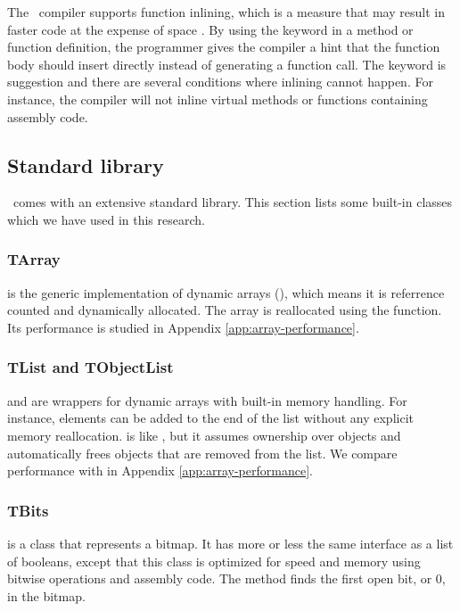 The \delphi~compiler supports function inlining, which is a measure that may result in faster code at the expense of space \cite{noauthor_undated-rx}. By using the  keyword in a method or function definition, the programmer gives the compiler a hint that the function body should insert directly instead of generating a function call. The keyword is suggestion and there are several conditions where inlining cannot happen. For instance, the compiler will not inline virtual methods or functions containing assembly code.

\subsection{Standard library}
\label{sub:Standard library}
\delphi~comes with an extensive standard library. This section lists some built-in classes which we have used in this research.

\subsubsection{TArray}
\label{ssub:TArray}
 is the generic implementation of dynamic arrays (), which means it is referrence counted and dynamically allocated. The array is reallocated using the  function. Its performance is studied in Appendix \ref{app:array-performance}.

\subsubsection{TList and TObjectList}
\label{ssub:TList and TObjectList}
 and  are wrappers for dynamic arrays with built-in memory handling. For instance, elements can be added to the end of the list without any explicit memory reallocation.  is like , but it assumes ownership over objects and automatically frees objects that are removed from the list. We compare  performance with  in Appendix \ref{app:array-performance}.

\subsubsection{TBits}
\label{ssub:TBits}
 is a class that represents a bitmap. It has more or less the same interface as a list of booleans, except that this class is optimized for speed and memory using bitwise operations and assembly code. The  method finds the first open bit, or 0, in the bitmap.
